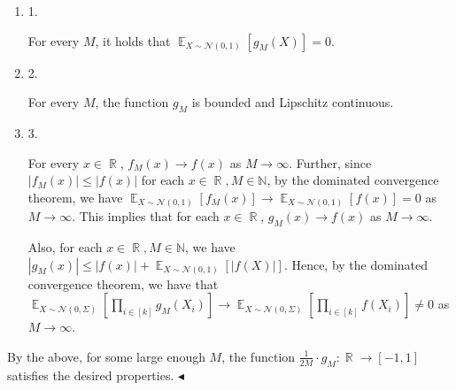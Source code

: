 \begin{enumerate}


\item[] 
1. 


For every $M$, it holds that $\mathop{\mathbb{E}}_{X\sim\mathcal{N}(0,1)}\left[g_{M}(X)\right]=0$.\par





\item[] 
2. 


For every $M$, the function $g_{M}$ is bounded and Lipschitz continuous.\par





\item[] 
3. 


For every $x\in\mathop{\mathbb{R}}$, $f_{M}(x)\to f(x)$ as $M\to\infty$. Further, since $\left|f_{M}(x)\right|\leqslant\left|f(x)\right|$ for each $x\in\mathop{\mathbb{R}},M\in\mathbb{N}$, by the dominated convergence theorem, we have $\mathop{\mathbb{E}}_{X\sim\mathcal{N}(0,1)}\left[f_{M}(x)\right]\to\mathop{\mathbb{E}}_{X\sim\mathcal{N}(0,1)}\left[f(x)\right]=0$ as $M\to\infty$.
This implies that for each $x\in\mathop{\mathbb{R}}$, $g_{M}(x)\to f(x)$ as $M\to\infty$.\par




Also, for each $x\in\mathop{\mathbb{R}},M\in\mathbb{N}$, we have $\left|g_{M}(x)\right|\leqslant\left|f(x)\right|+\mathop{\mathbb{E}}_{X\sim\mathcal{N}(0,1)}\left[\left|f(X)\right|\right]$. Hence, by the dominated convergence theorem, we have that $\mathop{\mathbb{E}}_{X\sim\mathcal{N}(0,\Sigma)}\left[\prod_{i\in[k]}g_{M}(X_{i})\right]\to\mathop{\mathbb{E}}_{X\sim\mathcal{N}(0,\Sigma)}\left[\prod_{i\in[k]}f(X_{i})\right]\not=0$ as $M\to\infty$.\par





\end{enumerate}




By the above, for some large enough $M$, the function $\frac{1}{2M}\cdot g_{M}:\mathop{\mathbb{R}}\to[-1,1]$ satisfies the desired properties.
$\blacktriangleleft$\par







